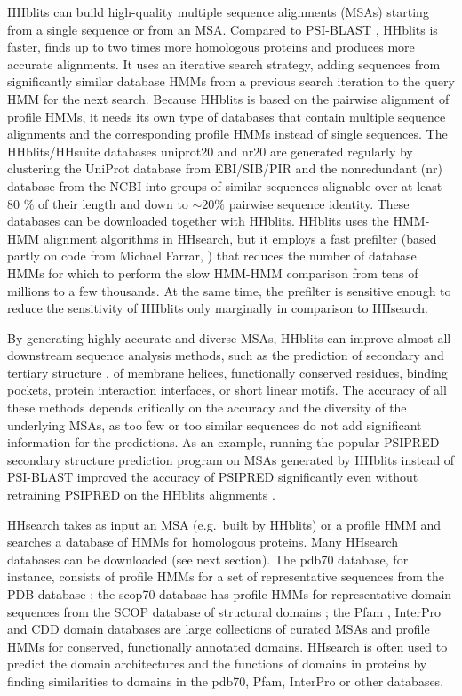\documentclass[11pt,a4paper]{article}
\begin{document}
HHblits can build high-quality multiple sequence alignments (MSAs) starting from a single sequence or from an MSA. Compared to PSI-BLAST \cite{Altschul:1997}, HHblits is faster, finds up to two times more homologous proteins and produces more accurate alignments. It uses an iterative search strategy, adding sequences from significantly similar database HMMs from a previous search iteration to the query HMM for the next search. Because HHblits is based on the pairwise alignment of profile HMMs, it needs its own type of databases that contain multiple sequence alignments and the corresponding profile HMMs instead of single sequences. The HHblits/HHsuite databases uniprot20 and nr20 are generated regularly by clustering the UniProt database \cite{uniprot:2010} from EBI/SIB/PIR and the nonredundant (nr) database from the NCBI into groups of similar sequences alignable over at least 80 \% of their length and down to $\sim 20 \%$ pairwise sequence identity. These databases can be downloaded together with HHblits. HHblits uses the HMM-HMM alignment algorithms in HHsearch, but it employs a fast prefilter (based partly on code from Michael Farrar, \cite{Farrar:2007}) that reduces the number of database HMMs for which to perform the slow HMM-HMM comparison from tens of millions to a few thousands. At the same time, the prefilter is sensitive enough to reduce the sensitivity of HHblits only marginally in comparison to HHsearch. 

By generating highly accurate and diverse MSAs, HHblits can improve almost all downstream sequence analysis methods, such as the prediction of secondary and tertiary structure \cite{Jones:1999, Marks:2011}, of membrane helices, functionally conserved residues, binding pockets, protein interaction interfaces, or short linear motifs. The accuracy of all these methods depends critically on the accuracy and the diversity of the underlying MSAs, as too few or too similar sequences do not add significant information for the predictions. As an example, running the popular PSIPRED secondary structure prediction program \cite{Jones:1999} on MSAs generated by HHblits instead of PSI-BLAST improved the accuracy of PSIPRED significantly even without retraining PSIPRED on the HHblits alignments \cite{Remmert:2011}. 

HHsearch takes as input an MSA (e.g.\ built by HHblits) or a profile HMM and searches a database of HMMs for homologous proteins. Many HHsearch databases can be downloaded (see next section). The pdb70 database, for instance, consists of profile HMMs for a set of representative sequences from the PDB database \cite{PDB:2004}; the scop70 database has profile HMMs for representative domain sequences from the SCOP database of structural domains \cite{SCOP:2000}; the Pfam \cite{Finn:2010}, InterPro \cite{Hunter:2009} and CDD \cite{Marchler:2011} domain databases are large collections of curated MSAs and profile HMMs for conserved, functionally annotated domains. HHsearch is often used to predict the domain architectures and the functions of domains in proteins by finding similarities to domains in the pdb70, Pfam, InterPro or other databases. 
\end{document}
